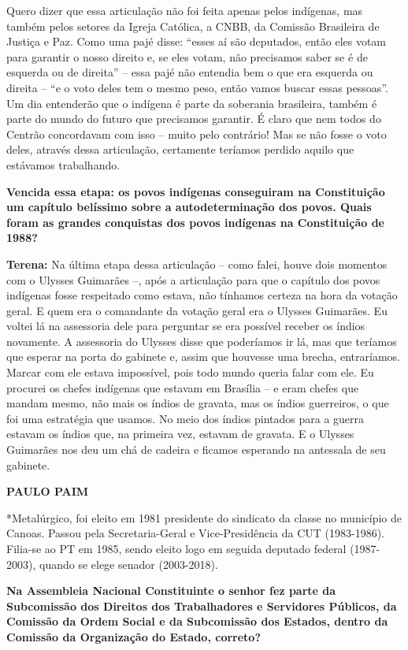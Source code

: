 Quero dizer que essa articulação não foi feita apenas pelos indígenas,
mas também pelos setores da Igreja Católica, a CNBB, da Comissão
Brasileira de Justiça e Paz. Como uma pajé disse: ``esses aí são
deputados, então eles votam para garantir o nosso direito e, se eles
votam, não precisamos saber se é de esquerda ou de direita'' -- essa
pajé não entendia bem o que era esquerda ou direita -- ``e o voto deles
tem o mesmo peso, então vamos buscar essas pessoas''. Um dia entenderão
que o indígena é parte da soberania brasileira, também é parte do mundo
do futuro que precisamos garantir. É claro que nem todos do Centrão
concordavam com isso -- muito pelo contrário! Mas se não fosse o voto
deles, através dessa articulação, certamente teríamos perdido aquilo que
estávamos trabalhando.

\textbf{Vencida essa etapa: os povos indígenas conseguiram na
Constituição um capítulo belíssimo sobre a autodeterminação dos povos.
Quais foram as grandes conquistas dos povos indígenas na Constituição de
1988?}

\textbf{Terena:} Na última etapa dessa articulação -- como falei, houve
dois momentos com o Ulysses Guimarães --, após a articulação para que o
capítulo dos povos indígenas fosse respeitado como estava, não tínhamos
certeza na hora da votação geral. E quem era o comandante da votação
geral era o Ulysses Guimarães. Eu voltei lá na assessoria dele para
perguntar se era possível receber os índios novamente. A assessoria do
Ulysses disse que poderíamos ir lá, mas que teríamos que esperar na
porta do gabinete e, assim que houvesse uma brecha, entraríamos. Marcar
com ele estava impossível, pois todo mundo queria falar com ele. Eu
procurei os chefes indígenas que estavam em Brasília -- e eram chefes
que mandam mesmo, não mais os índios de gravata, mas os índios
guerreiros, o que foi uma estratégia que usamos. No meio dos índios
pintados para a guerra estavam os índios que, na primeira vez, estavam
de gravata. E o Ulysses Guimarães nos deu um chá de cadeira e ficamos
esperando na antessala de seu gabinete.

\textbf{PAULO PAIM}

*Metalúrgico, foi eleito em 1981 presidente do sindicato da classe no
município de Canoas. Passou pela Secretaria-Geral e Vice-Presidência da
CUT (1983-1986). Filia-se ao PT em 1985, sendo eleito logo em seguida
deputado federal (1987-2003), quando se elege senador (2003-2018).

\textbf{Na Assembleia Nacional Constituinte o senhor fez parte da
Subcomissão dos Direitos dos Trabalhadores e Servidores Públicos, da
Comissão da Ordem Social e da Subcomissão dos Estados, dentro da
Comissão da Organização do Estado, correto?}

